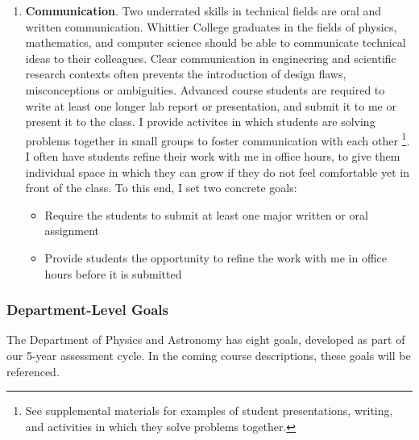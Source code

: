 \documentclass[../../main.tex]{subfiles}
\begin{document}
\begin{enumerate}
\item \textbf{Communication}.  Two underrated skills in technical fields are oral and written communication.  Whittier College graduates in the fields of physics, mathematics, and computer science should be able to communicate technical ideas to their colleagues.  Clear communication in engineering and scientific research contexts often prevents the introduction of design flaws, misconceptions or ambiguities.  Advanced course students are required to write at least one longer lab report or presentation, and submit it to me or present it to the class.  I provide activites in which students are solving problems together in small groups to foster communication with each other \footnote{See supplemental materials for examples of student presentations, writing, and activities in which they solve problems together.}.  I often have students refine their work with me in office hours, to give them individual space in which they can grow if they do not feel comfortable yet in front of the class.  To this end, I set two concrete goals:

\begin{itemize}
\item Require the students to submit at least one major written or oral assignment
\item Provide students the opportunity to refine the work with me in office hours before it is submitted %
\end{itemize}

\end{enumerate}

\subsubsection{Department-Level Goals}

The Department of Physics and Astronomy has eight goals, developed as part of our 5-year assessment cycle. In the coming course descriptions, these goals will be referenced.
\end{document}

